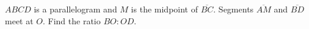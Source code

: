 $ABCD$ is a parallelogram and $M$ is the midpoint of $\overline{BC}$. Segments $\overline{AM}$ and $\overline{BD}$ meet at $O$. Find the ratio $BO:OD$.
